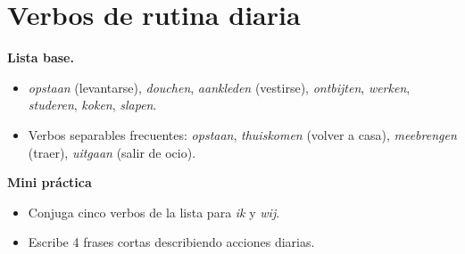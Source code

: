 \section{Verbos de rutina diaria}
\textbf{Lista base.}
\begin{itemize}[leftmargin=*]
  \item \textit{opstaan} (levantarse), \textit{douchen}, \textit{aankleden} (vestirse), \textit{ontbijten}, \textit{werken}, \textit{studeren}, \textit{koken}, \textit{slapen}.
  \item Verbos separables frecuentes: \textit{opstaan}, \textit{thuiskomen} (volver a casa), \textit{meebrengen} (traer), \textit{uitgaan} (salir de ocio).
\end{itemize}

\textbf{Mini práctica}
\begin{itemize}[leftmargin=*]
  \item Conjuga cinco verbos de la lista para \textit{ik} y \textit{wij}.
  \item Escribe 4 frases cortas describiendo acciones diarias.
\end{itemize}
